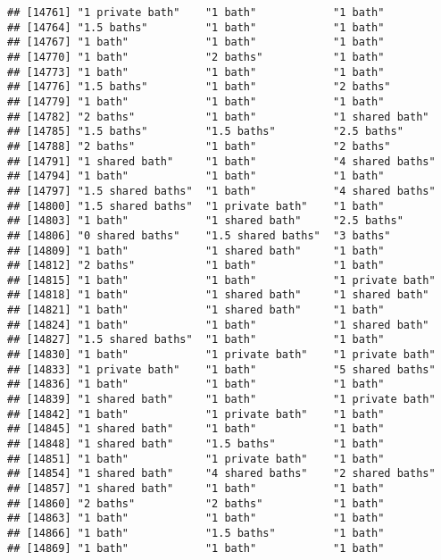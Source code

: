 \documentclass[
]{article}
\begin{document}
\begin{verbatim}
## [14761] "1 private bath"    "1 bath"            "1 bath"           
## [14764] "1.5 baths"         "1 bath"            "1 bath"           
## [14767] "1 bath"            "1 bath"            "1 bath"           
## [14770] "1 bath"            "2 baths"           "1 bath"           
## [14773] "1 bath"            "1 bath"            "1 bath"           
## [14776] "1.5 baths"         "1 bath"            "2 baths"          
## [14779] "1 bath"            "1 bath"            "1 bath"           
## [14782] "2 baths"           "1 bath"            "1 shared bath"    
## [14785] "1.5 baths"         "1.5 baths"         "2.5 baths"        
## [14788] "2 baths"           "1 bath"            "2 baths"          
## [14791] "1 shared bath"     "1 bath"            "4 shared baths"   
## [14794] "1 bath"            "1 bath"            "1 bath"           
## [14797] "1.5 shared baths"  "1 bath"            "4 shared baths"   
## [14800] "1.5 shared baths"  "1 private bath"    "1 bath"           
## [14803] "1 bath"            "1 shared bath"     "2.5 baths"        
## [14806] "0 shared baths"    "1.5 shared baths"  "3 baths"          
## [14809] "1 bath"            "1 shared bath"     "1 bath"           
## [14812] "2 baths"           "1 bath"            "1 bath"           
## [14815] "1 bath"            "1 bath"            "1 private bath"   
## [14818] "1 bath"            "1 shared bath"     "1 shared bath"    
## [14821] "1 bath"            "1 shared bath"     "1 bath"           
## [14824] "1 bath"            "1 bath"            "1 shared bath"    
## [14827] "1.5 shared baths"  "1 bath"            "1 bath"           
## [14830] "1 bath"            "1 private bath"    "1 private bath"   
## [14833] "1 private bath"    "1 bath"            "5 shared baths"   
## [14836] "1 bath"            "1 bath"            "1 bath"           
## [14839] "1 shared bath"     "1 bath"            "1 private bath"   
## [14842] "1 bath"            "1 private bath"    "1 bath"           
## [14845] "1 shared bath"     "1 bath"            "1 bath"           
## [14848] "1 shared bath"     "1.5 baths"         "1 bath"           
## [14851] "1 bath"            "1 private bath"    "1 bath"           
## [14854] "1 shared bath"     "4 shared baths"    "2 shared baths"   
## [14857] "1 shared bath"     "1 bath"            "1 bath"           
## [14860] "2 baths"           "2 baths"           "1 bath"           
## [14863] "1 bath"            "1 bath"            "1 bath"           
## [14866] "1 bath"            "1.5 baths"         "1 bath"           
## [14869] "1 bath"            "1 bath"            "1 bath"           

\end{verbatim}
\end{document}
